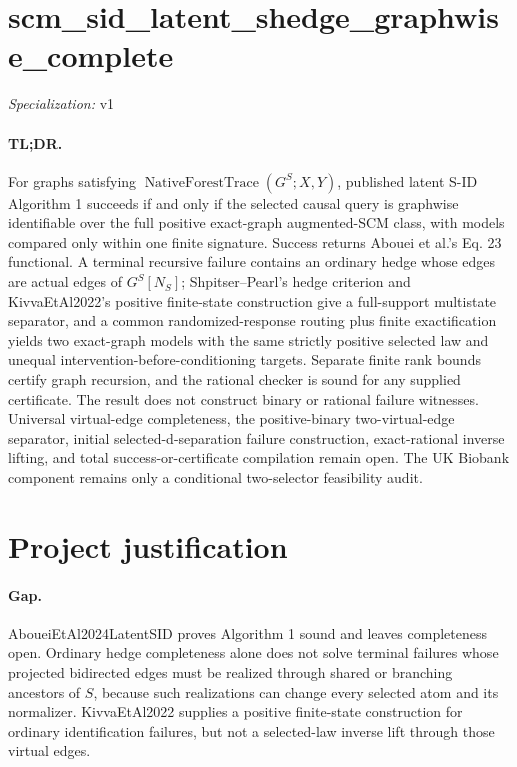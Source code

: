 \documentclass{article}
\begin{document}
\sloppy

\section*{scm\_\allowbreak{}sid\_\allowbreak{}latent\_\allowbreak{}shedge\_\allowbreak{}graphwise\_\allowbreak{}complete}

\noindent\textit{Specialization:} v1\par

\paragraph{TL;DR.} For graphs satisfying \(\operatorname{NativeForestTrace}(G^S;X,Y)\), published latent S-ID Algorithm 1 succeeds if and only if the selected causal query is graphwise identifiable over the full positive exact-graph augmented-SCM class, with models compared only within one finite signature. Success returns Abouei et al.'s Eq. 23 functional. A terminal recursive failure contains an ordinary hedge whose edges are actual edges of \(G^S[N_S]\); Shpitser--Pearl's hedge criterion and KivvaEtAl2022's positive finite-state construction give a full-support multistate separator, and a common randomized-response routing plus finite exactification yields two exact-graph models with the same strictly positive selected law and unequal intervention-before-conditioning targets. Separate finite rank bounds certify graph recursion, and the rational checker is sound for any supplied certificate. The result does not construct binary or rational failure witnesses. Universal virtual-edge completeness, the positive-binary two-virtual-edge separator, initial selected-d-separation failure construction, exact-rational inverse lifting, and total success-or-certificate compilation remain open. The UK Biobank component remains only a conditional two-selector feasibility audit.

\section{Project justification}

\paragraph{Gap.} AboueiEtAl2024LatentSID proves Algorithm 1 sound and leaves completeness open. Ordinary hedge completeness alone does not solve terminal failures whose projected bidirected edges must be realized through shared or branching ancestors of \(S\), because such realizations can change every selected atom and its normalizer. KivvaEtAl2022 supplies a positive finite-state construction for ordinary identification failures, but not a selected-law inverse lift through those virtual edges.
\end{document}
